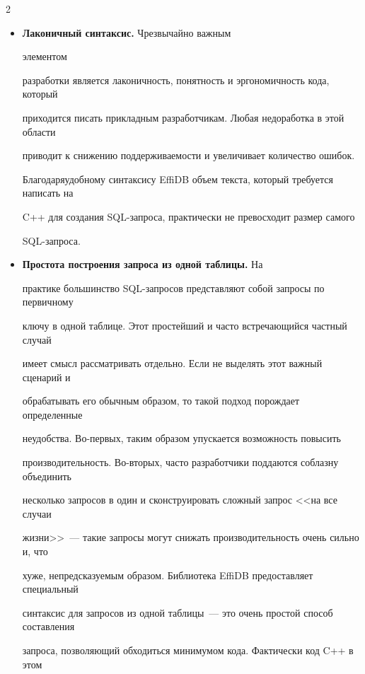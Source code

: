 \begin{multicols}{2}
\begin{itemize}
динамическую библиотеку. Можно также менять СУБД в процессе работы 

приложения и использовать несколько СУБД одновременно.

\item[$\bullet$] \textbf{Лаконичный синтаксис.} Чрезвычайно важным\linebreak

 элементом 

разработки является лаконичность, понятность и эргономичность кода, \mbox{который} 

приходится писать прикладным раз\-ра\-ботчи\-кам. Любая недоработка в этой области 

приводит к снижению поддерживаемости и увеличивает количество ошибок. 

Благодаря\linebreak удобному синтаксису EffiDB объем текста, который требуется написать на 

C++ для создания SQL-за\-про\-са, практически не превосходит размер самого 

SQL-за\-про\-са.

\item[$\bullet$] \textbf{Простота построения запроса из одной таблицы.} На 

практике большинство SQL-за\-про\-сов представляют собой запросы по первичному 

ключу в одной таблице. Этот простейший и часто встречающийся частный случай 

имеет смысл рассматривать отдельно. Если не выделять этот важный сценарий и 

обрабатывать его обычным образом, то такой подход порождает определенные 

неудобства. Во-пер\-вых, таким образом упускается возможность повысить 

производительность. Во-вто\-рых, часто разработчики поддаются соблазну объединить 

несколько запросов в один и сконструировать сложный запрос <<на все случаи 

жизни>>~--- такие запросы могут снижать производительность очень сильно и, что 

хуже, непредсказуемым образом. Биб\-лио\-те\-ка EffiDB предоставляет специальный 

синтаксис для запросов из одной таблицы~--- это очень простой способ составления 

запроса, позволяющий обходиться минимумом кода. Фактически код C++ в этом 


\end{itemize}
\end{multicols}
